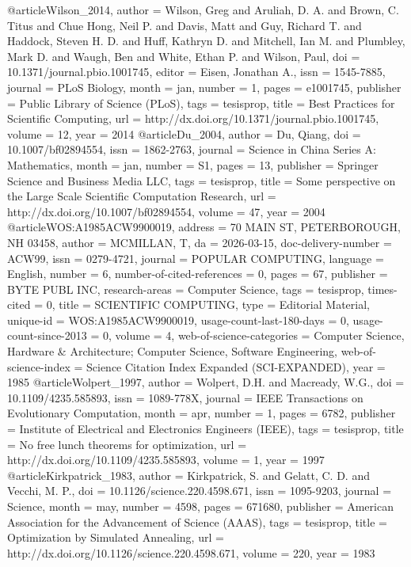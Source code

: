 @article{Wilson_2014,
 author = {Wilson, Greg and Aruliah, D. A. and Brown, C. Titus and Chue Hong, Neil P. and Davis, Matt and Guy, Richard T. and Haddock, Steven H. D. and Huff, Kathryn D. and Mitchell, Ian M. and Plumbley, Mark D. and Waugh, Ben and White, Ethan P. and Wilson, Paul},
 doi = {10.1371/journal.pbio.1001745},
 editor = {Eisen, Jonathan A.},
 issn = {1545-7885},
 journal = {PLoS Biology},
 month = jan,
 number = {1},
 pages = {e1001745},
 publisher = {Public Library of Science (PLoS)},
 tags = {tesisprop},
 title = {Best Practices for Scientific Computing},
 url = {http://dx.doi.org/10.1371/journal.pbio.1001745},
 volume = {12},
 year = {2014}
}
@article{Du_2004,
 author = {Du, Qiang},
 doi = {10.1007/bf02894554},
 issn = {1862-2763},
 journal = {Science in China Series A: Mathematics},
 month = jan,
 number = {S1},
 pages = {1{\textendash}3},
 publisher = {Springer Science and Business Media LLC},
 tags = {tesisprop},
 title = {Some perspective on the Large Scale Scientific Computation Research},
 url = {http://dx.doi.org/10.1007/bf02894554},
 volume = {47},
 year = {2004}
}
@article{WOS:A1985ACW9900019,
 address = {70 MAIN ST, PETERBOROUGH, NH 03458},
 author = {MCMILLAN, T},
 da = {2026-03-15},
 doc-delivery-number = {ACW99},
 issn = {0279-4721},
 journal = {POPULAR COMPUTING},
 language = {English},
 number = {6},
 number-of-cited-references = {0},
 pages = {67},
 publisher = {BYTE PUBL INC},
 research-areas = {Computer Science},
 tags = {tesisprop},
 times-cited = {0},
 title = {SCIENTIFIC COMPUTING},
 type = {Editorial Material},
 unique-id = {WOS:A1985ACW9900019},
 usage-count-last-180-days = {0},
 usage-count-since-2013 = {0},
 volume = {4},
 web-of-science-categories = {Computer Science, Hardware \& Architecture; Computer Science, Software
Engineering},
 web-of-science-index = {Science Citation Index Expanded (SCI-EXPANDED)},
 year = {1985}
}
@article{Wolpert_1997,
 author = {Wolpert, D.H. and Macready, W.G.},
 doi = {10.1109/4235.585893},
 issn = {1089-778X},
 journal = {IEEE Transactions on Evolutionary Computation},
 month = apr,
 number = {1},
 pages = {67{\textendash}82},
 publisher = {Institute of Electrical and Electronics Engineers (IEEE)},
 tags = {tesisprop},
 title = {No free lunch theorems for optimization},
 url = {http://dx.doi.org/10.1109/4235.585893},
 volume = {1},
 year = {1997}
}
@article{Kirkpatrick_1983,
 author = {Kirkpatrick, S. and Gelatt, C. D. and Vecchi, M. P.},
 doi = {10.1126/science.220.4598.671},
 issn = {1095-9203},
 journal = {Science},
 month = may,
 number = {4598},
 pages = {671{\textendash}680},
 publisher = {American Association for the Advancement of Science (AAAS)},
 tags = {tesisprop},
 title = {Optimization by Simulated Annealing},
 url = {http://dx.doi.org/10.1126/science.220.4598.671},
 volume = {220},
 year = {1983}
}
